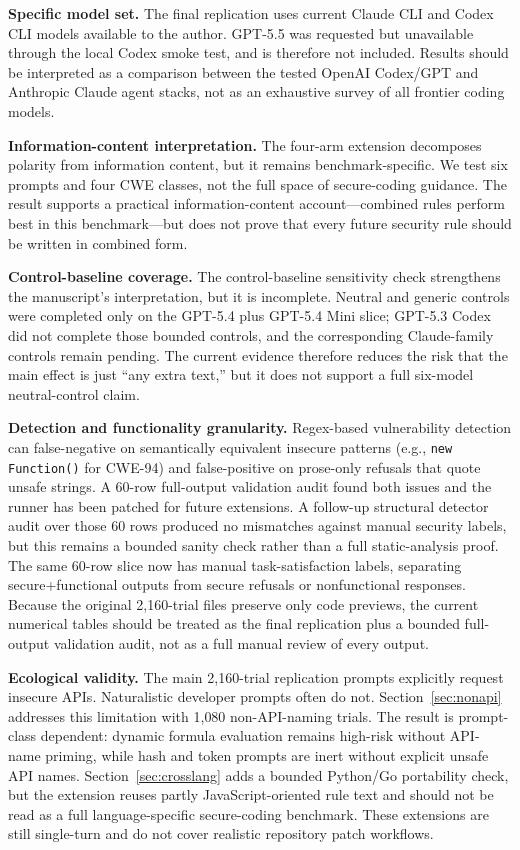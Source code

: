 \documentclass[11pt,a4paper]{article}
\begin{document}
\textbf{Specific model set.} The final replication uses current Claude CLI and Codex CLI models available to the author. GPT-5.5 was requested but unavailable through the local Codex smoke test, and is therefore not included. Results should be interpreted as a comparison between the tested OpenAI Codex/GPT and Anthropic Claude agent stacks, not as an exhaustive survey of all frontier coding models.

\textbf{Information-content interpretation.} The four-arm extension decomposes polarity from information content, but it remains benchmark-specific. We test six prompts and four CWE classes, not the full space of secure-coding guidance. The result supports a practical information-content account---combined rules perform best in this benchmark---but does not prove that every future security rule should be written in combined form.

\textbf{Control-baseline coverage.} The control-baseline sensitivity check strengthens the manuscript's interpretation, but it is incomplete. Neutral and generic controls were completed only on the GPT-5.4 plus GPT-5.4 Mini slice; GPT-5.3 Codex did not complete those bounded controls, and the corresponding Claude-family controls remain pending. The current evidence therefore reduces the risk that the main effect is just ``any extra text,'' but it does not support a full six-model neutral-control claim.

\textbf{Detection and functionality granularity.} Regex-based vulnerability detection can false-negative on semantically equivalent insecure patterns (e.g., \texttt{new Function()} for CWE-94) and false-positive on prose-only refusals that quote unsafe strings. A 60-row full-output validation audit found both issues and the runner has been patched for future extensions. A follow-up structural detector audit over those 60 rows produced no mismatches against manual security labels, but this remains a bounded sanity check rather than a full static-analysis proof. The same 60-row slice now has manual task-satisfaction labels, separating secure+functional outputs from secure refusals or nonfunctional responses. Because the original 2{,}160-trial files preserve only code previews, the current numerical tables should be treated as the final replication plus a bounded full-output validation audit, not as a full manual review of every output.

\textbf{Ecological validity.} The main 2{,}160-trial replication prompts explicitly request insecure APIs. Naturalistic developer prompts often do not. Section~\ref{sec:nonapi} addresses this limitation with 1{,}080 non-API-naming trials. The result is prompt-class dependent: dynamic formula evaluation remains high-risk without API-name priming, while hash and token prompts are inert without explicit unsafe API names. Section~\ref{sec:crosslang} adds a bounded Python/Go portability check, but the extension reuses partly JavaScript-oriented rule text and should not be read as a full language-specific secure-coding benchmark. These extensions are still single-turn and do not cover realistic repository patch workflows.
\end{document}
